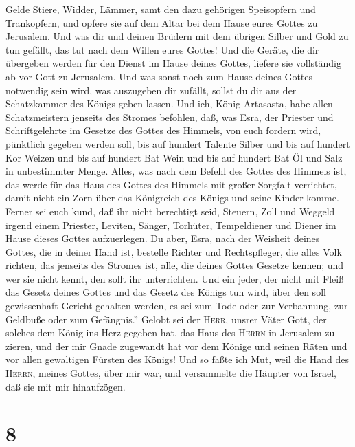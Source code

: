 Gelde Stiere, Widder, Lämmer, samt den dazu gehörigen Speisopfern und
Trankopfern, und opfere sie auf dem Altar bei dem Hause eures Gottes zu
Jerusalem.  Und was dir und deinen Brüdern mit dem
übrigen Silber und Gold zu tun gefällt, das tut nach dem Willen eures
Gottes!  Und die Geräte, die dir übergeben werden für den
Dienst im Hause deines Gottes, liefere sie vollständig ab vor Gott zu
Jerusalem.  Und was sonst noch zum Hause deines Gottes
notwendig sein wird, was auszugeben dir zufällt, sollst du dir aus der
Schatzkammer des Königs geben lassen.  Und ich, König
Artasasta, habe allen Schatzmeistern jenseits des Stromes befohlen, daß,
was Esra, der Priester und Schriftgelehrte im Gesetze des Gottes des
Himmels, von euch fordern wird, pünktlich gegeben werden soll,
 bis auf hundert Talente Silber und bis auf hundert Kor
Weizen und bis auf hundert Bat Wein und bis auf hundert Bat Öl und Salz
in unbestimmter Menge.  Alles, was nach dem Befehl des
Gottes des Himmels ist, das werde für das Haus des Gottes des Himmels
mit großer Sorgfalt verrichtet, damit nicht ein Zorn über das Königreich
des Königs und seine Kinder komme.  Ferner sei euch kund,
daß ihr nicht berechtigt seid, Steuern, Zoll und Weggeld irgend einem
Priester, Leviten, Sänger, Torhüter, Tempeldiener und Diener im Hause
dieses Gottes aufzuerlegen.  Du aber, Esra, nach der
Weisheit deines Gottes, die in deiner Hand ist, bestelle Richter und
Rechtspfleger, die alles Volk richten, das jenseits des Stromes ist,
alle, die deines Gottes Gesetze kennen; und wer sie nicht kennt, den
sollt ihr unterrichten.  Und ein jeder, der nicht mit
Fleiß das Gesetz deines Gottes und das Gesetz des Königs tun wird, über
den soll gewissenhaft Gericht gehalten werden, es sei zum Tode oder zur
Verbannung, zur Geldbuße oder zum Gefängnis.''  Gelobt
sei der \textsc{Herr}, unsrer Väter Gott, der solches dem König ins Herz
gegeben hat, das Haus des \textsc{Herrn} in Jerusalem zu zieren,
 und der mir Gnade zugewandt hat vor dem Könige und
seinen Räten und vor allen gewaltigen Fürsten des Königs! Und so faßte
ich Mut, weil die Hand des \textsc{Herrn}, meines Gottes, über mir war,
und versammelte die Häupter von Israel, daß sie mit mir hinaufzögen.

\hypertarget{section-7}{%
\section{8}\label{section-7}}

